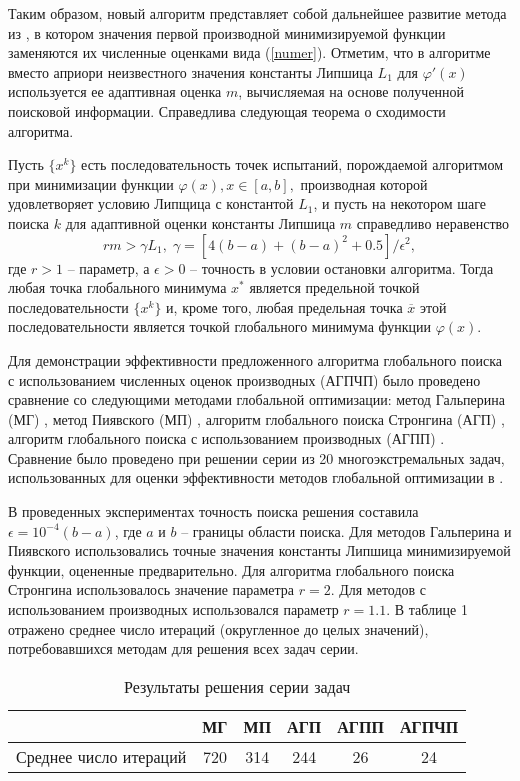 \documentclass[11pt, oneside, a4paper]{article}
\begin{document}
Таким образом, новый алгоритм представляет собой дальнейшее развитие метода из \cite{Gergel96}, в котором значения первой производной минимизируемой функции заменяются их численные оценками вида (\ref{numer}). Отметим, что в алгоритме вместо априори неизвестного значения константы Липшица $L_1$ для $\varphi'(x)$ используется ее адаптивная оценка $m$, вычисляемая на основе полученной поисковой информации. 
Справедлива следующая теорема о сходимости алгоритма.
\begin{Teor} Пусть $\{x^k\}$ есть последовательность точек испытаний, порождаемой алгоритмом при минимизации  функции $\varphi(x), x\in[a,b],$ производная которой удовлетворяет условию Липщица с константой $L_1$, и пусть на некотором шаге поиска $k$ для адаптивной оценки константы Липшица $m$ справедливо неравенство 
\[
rm>\gamma L_1, \; \gamma = \left[ 4(b-a) + (b-a)^2 +0.5 \right]/\epsilon^2 ,
\]
где $r>1$ -- параметр, а $\epsilon>0$ -- точность в условии остановки алгоритма.
Тогда любая точка глобального минимума $x^*$ является предельной точкой последовательности $\{x^k\}$ и, кроме того, любая предельная точка $\overline{x}$ этой последовательности является точкой глобального минимума функции $\varphi(x)$.
\end{Teor}

Для демонстрации эффективности предложенного алгоритма глобального поиска с использованием численных оценок производных (АГПЧП)  было проведено сравнение со следующими методами глобальной оптимизации: метод Гальперина (МГ) \cite{Galperin}, метод Пиявского (МП) \cite{Pijavski72}, алгоритм глобального поиска Стронгина (АГП) \cite{Strongin2013}, алгоритм глобального поиска с использованием производных (АГПП) \cite{Gergel96}. Сравнение было проведено при решении серии из 20 многоэкстремальных задач, использованных для оценки эффективности методов глобальной оптимизации в \cite{Gergel96}.

В проведенных экспериментах точность поиска решения составила $\epsilon=10^{-4}(b-a)$, где $a$ и $b$ -- границы области поиска. Для методов Гальперина и Пиявского использовались точные значения константы Липшица минимизируемой функции, оцененные предварительно. Для алгоритма глобального поиска Стронгина использовалось значение параметра $r=2$. Для методов с использованием производных использовался параметр $r=1.1$. В таблице 1 отражено среднее число итераций (округленное до целых значений), потребовавшихся методам для решения всех задач серии. 

\begin{table}[h]
	\caption{Результаты решения серии задач}
	\begin{center}
		\begin{tabular}{|c|c|c|c|c|c|}
			\hline
			& МГ & МП & АГП & АГПП & АГПЧП \\
			\hline
			\hline
			Среднее число итераций & 720 & 314 & 244 & 26 & 24  \\
			\hline
		\end{tabular}
	\end{center}
\end{table}
\end{document}
